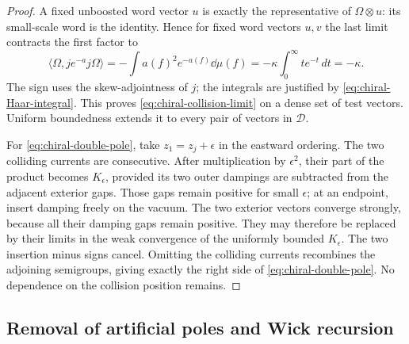 \begin{proof}
A fixed unboosted word vector $u$ is exactly the representative of
$\Omega\otimes u$: its small-scale word is the identity. Hence for
fixed word vectors $u,v$ the last limit contracts the first factor to
\[
 \langle\Omega,je^{-a}j\Omega\rangle
   =-\int a(f)^2e^{-a(f)}\dd\mu(f)
   =-\kappa\int_0^\infty t e^{-t}\,dt=-\kappa.
\]
The sign uses the skew-adjointness of $j$; the integrals are justified
by \eqref{eq:chiral-Haar-integral}. This proves
\eqref{eq:chiral-collision-limit} on a dense set of test vectors.
Uniform boundedness extends it to every pair of vectors in $\mathcal D$.

For \eqref{eq:chiral-double-pole}, take $z_1=z_j+\epsilon$ in the
eastward ordering. The two colliding currents are consecutive. After
multiplication by $\epsilon^2$, their part of the product becomes
$K_\epsilon$, provided its two outer dampings are subtracted from the
adjacent exterior gaps. Those gaps remain positive for small $\epsilon$;
at an endpoint, insert damping freely on the vacuum. The two exterior
vectors converge strongly, because all their damping gaps remain positive.
They may therefore be replaced by their limits in the weak convergence
of the uniformly bounded $K_\epsilon$. The two insertion minus signs
cancel. Omitting the colliding currents recombines the adjoining
semigroups, giving exactly the right side of
\eqref{eq:chiral-double-pole}. No dependence on the collision position
remains.
\end{proof}

\subsection{Removal of artificial poles and Wick recursion}

